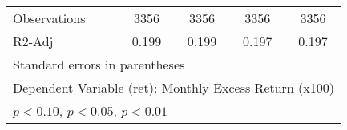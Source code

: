 \begin{table}[htbp]
\begin{tabular}{l*{4}{c}}
Observations        &        3356         &        3356         &        3356         &        3356         \\
R2-Adj              &       0.199         &       0.199         &       0.197         &       0.197         \\
\hline\hline
\multicolumn{5}{l}{\footnotesize Standard errors in parentheses}\\
\multicolumn{5}{l}{\footnotesize Dependent Variable (ret): Monthly Excess Return (x100)}\\
\multicolumn{5}{l}{\footnotesize \sym{*} \(p<0.10\), \sym{**} \(p<0.05\), \sym{***} \(p<0.01\)}\\
\end{tabular}
\end{table}
